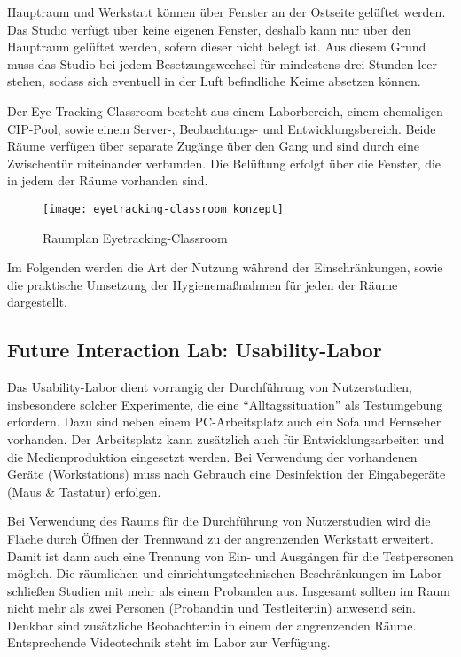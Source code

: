 Hauptraum und Werkstatt können über Fenster an der Ostseite gelüftet werden.
Das Studio verfügt über keine eigenen Fenster, deshalb kann nur über den Hauptraum gelüftet werden, sofern dieser nicht belegt ist.
Aus diesem Grund muss das Studio bei jedem Besetzungswechsel für mindestens drei Stunden leer stehen, sodass sich eventuell in der Luft befindliche Keime absetzen können.

\medskip
\noindent
Der Eye-Tracking-Classroom besteht aus einem Laborbereich, einem ehemaligen CIP-Pool, sowie einem Server-, Beobachtungs- und Entwicklungsbereich. Beide Räume verfügen über separate Zugänge über den Gang und sind durch eine Zwischentür miteinander verbunden.
Die Belüftung erfolgt über die Fenster, die in jedem der Räume vorhanden sind.

\medskip
\begin{figure}[h]
    \label{fig:raumplan_eyetracking}
    \centering
    \texttt{[image: eyetracking-classroom\_konzept]}
    \caption{Raumplan Eyetracking-Classroom}
\end{figure}

\medskip
\noindent
Im Folgenden werden die Art der Nutzung während der Einschränkungen, sowie die praktische Umsetzung der Hygienemaßnahmen für jeden der Räume dargestellt.

\subsection{Future Interaction Lab: Usability-Labor}\label{subsec:labore_fil_labor}


\noindent
Das Usability-Labor dient vorrangig der Durchführung von Nutzerstudien, insbesondere solcher Experimente, die eine ``Alltagssituation'' als Testumgebung erfordern. Dazu sind neben einem PC-Arbeitsplatz auch ein Sofa und Fernseher vorhanden.
Der Arbeitsplatz kann zusätzlich auch für Entwicklungsarbeiten und die Medienproduktion eingesetzt werden.
Bei Verwendung der vorhandenen Geräte (Workstations) muss nach Gebrauch eine Desinfektion der Eingabegeräte (Maus \& Tastatur) erfolgen.

\medskip
\noindent
Bei Verwendung des Raums für die Durchführung von Nutzerstudien wird die Fläche  durch Öffnen der Trennwand zu der angrenzenden Werkstatt erweitert. Damit ist dann auch eine Trennung von Ein- und Ausgängen für die Testpersonen möglich.
Die räumlichen und einrichtungstechnischen  Beschränkungen im Labor schließen Studien mit mehr als einem Probanden aus.
Insgesamt sollten im Raum nicht mehr als zwei Personen (Proband:in und Testleiter:in) anwesend sein. Denkbar sind zusätzliche Beobachter:in in einem der angrenzenden Räume. Entsprechende Videotechnik steht im Labor zur Verfügung.

